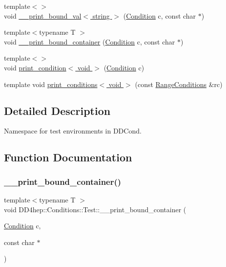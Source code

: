 \begin{DoxyCompactItemize}
\item 
{\footnotesize template$<$$>$ }\\void \hyperlink{namespace_d_d4hep_1_1_conditions_1_1_test_a972a45916702fce81a9f0bc73d0e4bf0}{\+\_\+\+\_\+print\+\_\+bound\+\_\+val$<$ string $>$} (\hyperlink{class_d_d4hep_1_1_conditions_1_1_condition}{Condition} c, const char $\ast$)
\item 
{\footnotesize template$<$typename T $>$ }\\void \hyperlink{namespace_d_d4hep_1_1_conditions_1_1_test_a3ad81aaa90311c64ac08c510f540f3d1}{\+\_\+\+\_\+print\+\_\+bound\+\_\+container} (\hyperlink{class_d_d4hep_1_1_conditions_1_1_condition}{Condition} c, const char $\ast$)
\item 
{\footnotesize template$<$$>$ }\\void \hyperlink{namespace_d_d4hep_1_1_conditions_1_1_test_a3a38a064024bb5bb204eeb9c005b2bf6}{print\+\_\+condition$<$ void $>$} (\hyperlink{class_d_d4hep_1_1_conditions_1_1_condition}{Condition} c)
\item 
template void \hyperlink{namespace_d_d4hep_1_1_conditions_1_1_test_acdce8ace7d03579186b713f0c76b0a15}{print\+\_\+conditions$<$ void $>$} (const \hyperlink{namespace_d_d4hep_1_1_conditions_ae765f0140a33973a430280f02b6062f4}{Range\+Conditions} \&rc)
\end{DoxyCompactItemize}


\subsection{Detailed Description}
Namespace for test environments in D\+D\+Cond. 

\subsection{Function Documentation}
\hypertarget{namespace_d_d4hep_1_1_conditions_1_1_test_a3ad81aaa90311c64ac08c510f540f3d1}{}\label{namespace_d_d4hep_1_1_conditions_1_1_test_a3ad81aaa90311c64ac08c510f540f3d1} 
\subsubsection{\texorpdfstring{\+\_\+\+\_\+print\+\_\+bound\+\_\+container()}{\_\_print\_bound\_container()}}
{\footnotesize\ttfamily template$<$typename T $>$ \\
void D\+D4hep\+::\+Conditions\+::\+Test\+::\+\_\+\+\_\+print\+\_\+bound\+\_\+container (\begin{DoxyParamCaption}\item[{\hyperlink{class_d_d4hep_1_1_conditions_1_1_condition}{Condition}}]{c,  }\item[{const char $\ast$}]{ }\end{DoxyParamCaption})}



